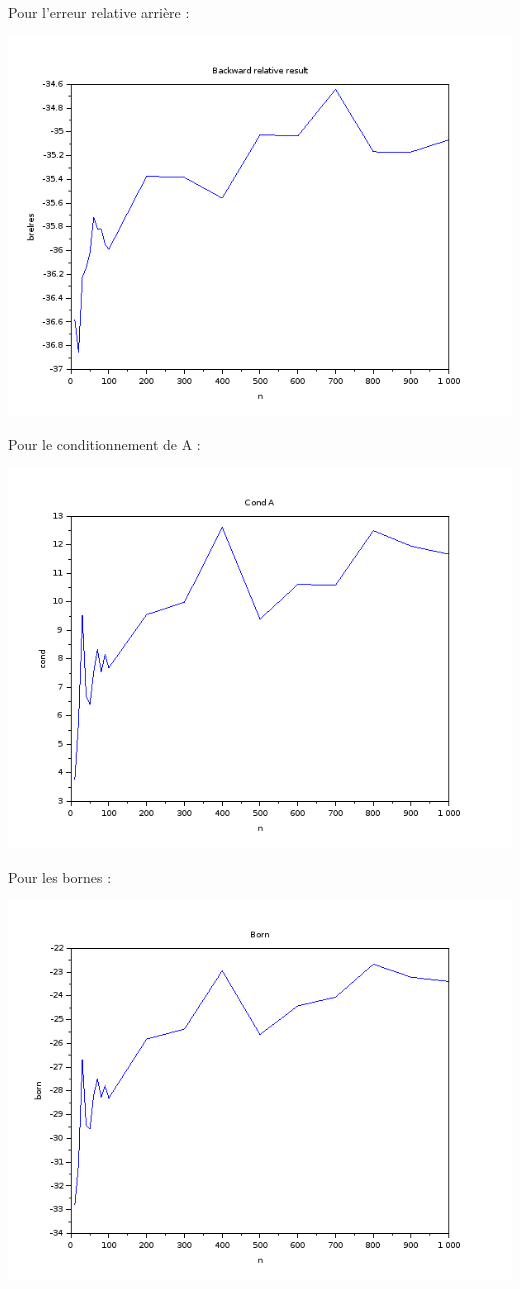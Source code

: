 \documentclass[12pt, letterpaper]{article}
\begin{document}
Pour l'erreur relative arrière :

\includegraphics[scale=0.5]{img/brelres.png}

Pour le conditionnement de A :

\includegraphics[scale=0.5]{img/capa.png}

Pour les bornes :

\includegraphics[scale=0.5]{img/born.png}
\end{document}

